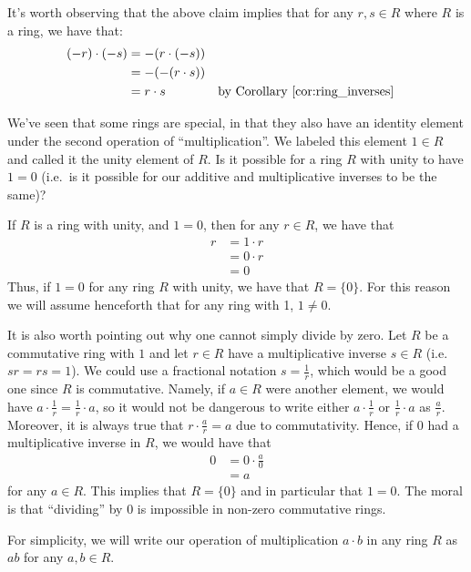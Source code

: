 \documentclass[12pt,letterpaper,DIV=11,final]{scrartcl}
\theoremstyle{plain}
\theoremstyle{definition}
\theoremstyle{remark}
\begin{document}
It's worth observing that the above claim implies that for any $r, s \in R$ where $R$ is a ring, we have that:
\begin{align*}
  (-r) \cdot (-s) &= -(r \cdot (-s)) \\
                  &= -( -(r \cdot s) ) \\
                  &= r \cdot s && \text{by Corollary~\ref{cor:ring_inverses}}
\end{align*}

We've seen that some rings are special, in that they also have an identity element under the second operation of \enquote{multiplication}.
We labeled this element $1 \in R$ and called it the unity element of $R$.
Is it possible for a ring $R$ with unity to have $1 = 0$ (i.e.\ is it possible for our additive and multiplicative inverses to be the same)?

If $R$ is a ring with unity, and $1 = 0$, then for any $r \in R$, we have that
\begin{align*}
  r &= 1 \cdot r \\
    &= 0 \cdot r \\
    &= 0
\end{align*}
Thus, if $1 = 0$ for any ring $R$ with unity, we have that $R = \{ 0 \}$.
For this reason we will assume henceforth that for any ring with 1, $1 \neq 0$.

It is also worth pointing out why one cannot simply divide by zero.
Let $R$ be a commutative ring with $1$ and let $r \in R$ have a multiplicative inverse $s \in R$ (i.e. $sr = rs = 1$).
We could use a fractional notation $s = \frac{1}{r}$, which would be a good one since $R$ is commutative.
Namely, if $a \in R$ were another element, we would have $a \cdot \frac{1}{r} = \frac{1}{r} \cdot a$, so it would not be dangerous to write either $a \cdot \frac{1}{r}$ or $\frac{1}{r} \cdot a$ as $\frac{a}{r}$.
Moreover, it is always true that $r \cdot \frac{a}{r} = a$ due to commutativity.
Hence, if $0$ had a multiplicative inverse in $R$, we would have that
\begin{align*}
  0 &= 0 \cdot \frac{a}{0} \\
    &= a
\end{align*}
for any $a \in R$.
This implies that $R = \{ 0 \}$ and in particular that $1 = 0$.
The moral is that \enquote{dividing} by 0 is impossible in non-zero commutative rings.

For simplicity, we will write our operation of multiplication $a \cdot b$ in any ring $R$ as $ab$ for any $a, b \in R$.
\end{document}
